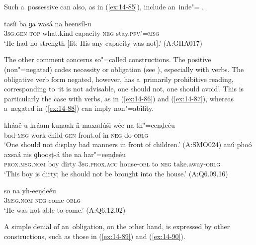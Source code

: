 Such a~possessive  can also, as in (\ref{ex:14-85}), include an~inde"= .

\begin{exe}
\ex
\label{ex:14-85}
\gll tasíi ba ɡa wasá na heensíl-u \\
\textsc{3sg.gen} \textsc{top} what.kind capacity \textsc{neg} stay.\textsc{pfv"=msg } \\
\glt `He had no strength [lit: His any capacity was not].' (A:GHA017)
\end{exe}

The other comment concerns so"=called  constructions. The positive (non"=negated)  codes necessity or obligation (see ), especially with  verbs. The obligative verb form negated, however, has a~primarily prohibitive reading, corresponding to `it is not advisable, one should not, one should avoid'. This is particularly the case with  verbs, as in (\ref{ex:14-86}) and (\ref{ex:14-87}), whereas a~negated in  (\ref{ex:14-88}) can imply non"=ability.

\ea
\label{ex:14-86}
\gll kháač-u kráam kuṇaak-íi maxadúši wée na  th"=eeṇḍeéu \\
bad-\textsc{msg} work child-\textsc{gen} front.of in \textsc{neg} do-\textsc{oblg } \\
\glt `One should not display bad manners in front of children.' (A:SMO024) 
\ex
\label{ex:14-87}
\gll anú phoó axsaá nis ɡhooṣṭ-á the na har"=eeṇḍeéu\\
\textsc{prox.msg.nom} boy dirty \textsc{3sg.prox.acc} house-\textsc{obl} to \textsc{neg} take.away-\textsc{oblg}\\
\glt `This boy is dirty; he should not be brought into the house.' (A:Q6.09.16)

\ex
\label{ex:14-88}
\gll so na yh-eeṇḍeéu\\
\textsc{3msg}.\textsc{nom} \textsc{neg} come-\textsc{oblg}\\
\glt `He was not able to come.' (A:Q6.12.02)
\z

A simple denial of an~obligation, on the other hand, is expressed by other constructions, such as those in (\ref{ex:14-89}) and (\ref{ex:14-90}).

